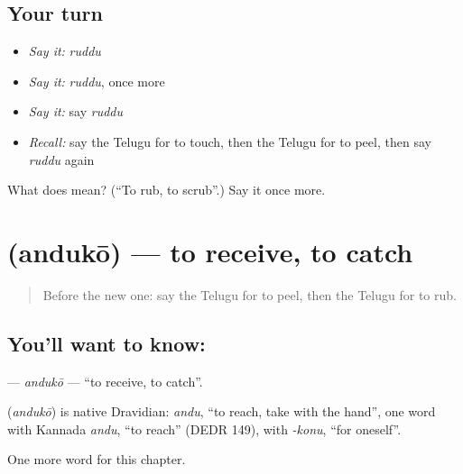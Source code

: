 \subsection*{Your turn}
\begin{itemize}
\raggedright
  \item \emph{Say it:} \emph{ruddu}
  \item \emph{Say it:} \emph{ruddu}, once more
  \item \emph{Say it:} say \emph{ruddu}
  \item \emph{Recall:} say the Telugu for to touch, then the Telugu for to peel, then say \emph{ruddu} again
\end{itemize}

\begin{tcolorbox}[breakable,colback=teal!4,colframe=teal!35!black,title={Before you move on}]
What does  mean? (\textquotedblleft{}To rub, to scrub\textquotedblright{}.) Say it once more.
\end{tcolorbox}
\section[\texorpdfstring{\te{అందుకో} (andukō)}{అందుకో (andukō)}]{ (andukō) — to receive, to catch}

\label{lesson:TE-C280-anduko}



\begin{quote}
Before the new one: say the Telugu for to peel, then the Telugu for to rub.
\end{quote}

\subsection*{You'll want to know: }
\textbf{} — \emph{andukō} — \textquotedblleft{}to receive, to catch\textquotedblright{}.

\begin{cousinweb}
\textbf{} (\emph{andukō}) is native Dravidian: \emph{andu}, \textquotedblleft{}to reach, take with the hand\textquotedblright{}, one word with Kannada \emph{andu}, \textquotedblleft{}to reach\textquotedblright{} (DEDR 149), with \emph{-konu}, \textquotedblleft{}for oneself\textquotedblright{}.
\end{cousinweb}

\begin{grammarlens}[title={What you've built}]
One more word for this chapter.
\end{grammarlens}

